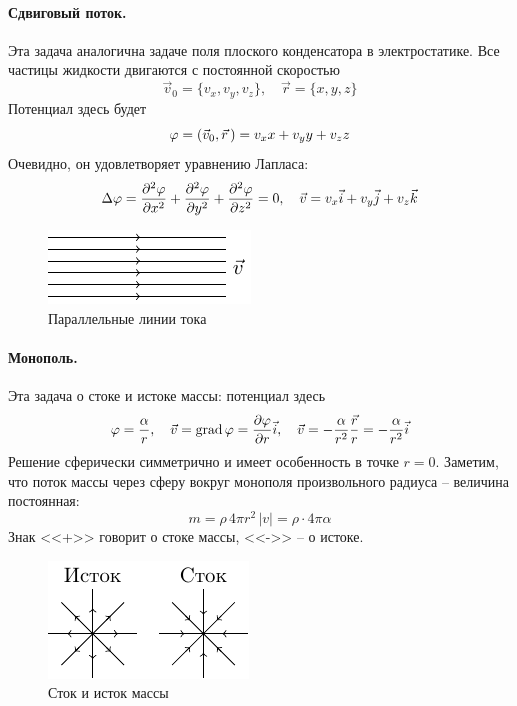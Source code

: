 \paragraph{Сдвиговый поток.} Эта задача аналогична задаче поля плоского конденсатора в электростатике. Все частицы жидкости двигаются с постоянной скоростью
\begin{equation}
    \vec{v}_0 = \{v_x, v_y, v_z\}, \quad
    \vec{r} = \{x,y,z\}
\end{equation}
Потенциал здесь будет
\begin{equation}
    \varphi = \qty(\vec{v}_0,\vec{r}\,) = v_x x + v_y y + v_z z
\end{equation}
Очевидно, он удовлетворяет уравнению Лапласа:
\begin{equation}
    \Delta \varphi = \pdv[2]{\varphi}{x}+ \pdv[2]{\varphi}{y} + \pdv[2]{\varphi}{z}=0, \quad
    \vec{v} = v_x \vec{i} + v_y \vec{j} + v_z \vec{k}
\end{equation}
\begin{figure}[H]
    \centering
    \includegraphics[scale=1.5]{img/sdvig}
    \caption{Параллельные линии тока}
    \label{fig:sdvigovuipotok}
\end{figure}

\paragraph{Монополь.} Эта задача о стоке и истоке массы: потенциал здесь
\begin{equation}
    \varphi = \frac{\alpha}{r}, \quad \vec{v} = \operatorname{grad} \varphi = \pdv{\varphi}{r} \vec{i}, \quad \vec{v} = -\frac{\alpha}{r^2}  \frac{\vec{r}}{r} = 
    -\frac{\alpha}{r^2} \vec{i}
\end{equation}
Решение сферически симметрично и имеет особенность в точке $r=0$. Заметим, что поток массы через сферу вокруг монополя произвольного радиуса -- величина постоянная:
\begin{equation}
    m = \rho\, 4\pi r^2\, |v| = \rho\cdot 4\pi\alpha
\end{equation}
Знак <<+>> говорит о стоке массы, <<->> -- о истоке.
\begin{figure}[H]
    \centering
    \includegraphics[scale=1.5]{img/stok_istok}
    \caption{Сток и исток массы}
    \label{fig:stokistok}
\end{figure}

